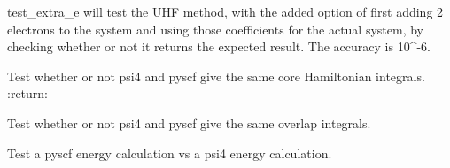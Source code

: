 \documentclass[letterpaper,10pt,english]{sphinxmanual}
\begin{document}
\begin{fulllineitems}
\label{\detokenize{tests:hf.tests.test_auth.test_extra_e}}
test\_extra\_e will test the UHF method, with the added option of first adding 2 electrons to the system and using
those coefficients for the actual system, by checking whether or not it returns the expected result.
The accuracy is 10\textasciicircum{}-6.

\end{fulllineitems}


\begin{fulllineitems}
\label{\detokenize{tests:hf.tests.test_auth.test_one_e}}
Test whether or not psi4 and pyscf give the same core Hamiltonian integrals.
:return:

\end{fulllineitems}


\begin{fulllineitems}
\label{\detokenize{tests:hf.tests.test_auth.test_overlap}}
Test whether or not psi4 and pyscf give the same overlap integrals.

\end{fulllineitems}


\begin{fulllineitems}
\label{\detokenize{tests:hf.tests.test_auth.test_pyscf_vs_psi4}}
Test a pyscf energy calculation vs a psi4 energy calculation.

\end{fulllineitems}

\end{document}
